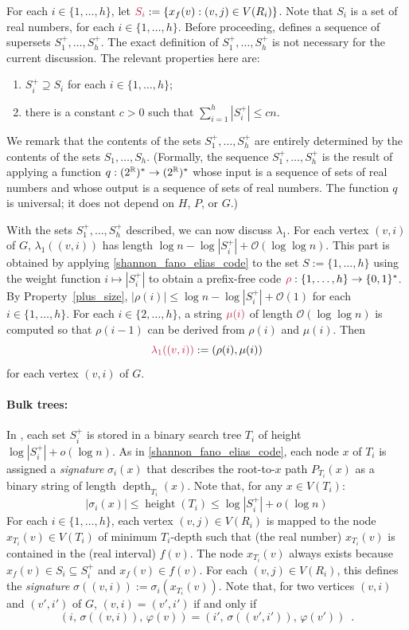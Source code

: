 \documentclass{patmorin}
\makeatletter
\renewcommand{\le}{\leqslant}
\DeclareMathOperator{\height}{height}
\DeclareMathOperator{\depth}{depth}
\newcommand{\defin}[1]{\emph{\textcolor{brightmaroon}{#1}}}
\def\mathcolor#1#{\@mathcolor{#1}}
\def\@mathcolor#1#2#3{%
  \protect\leavevmode
  \begingroup
    \color#1{#2}#3%
  \endgroup
}
\newcommand{\mathdefin}[1]{\mathcolor{brightmaroon}{#1}}
\newcommand{\Oh}{\mathcal{O}}
\makeatother
\begin{document}
  For each $i\in\{1,\ldots,h\}$, let $\mathdefin{S_i}:=\{x_f(v):(v,j)\in V(R_i)\}$.
  Note that $S_i$ is a set of real numbers, for each $i\in\{1,\ldots,h\}$.
  Before proceeding, \cite{dujmovic.esperet.ea:adjacency} defines a sequence of supersets \defin{$S^+_1,\ldots,S^+_h$}. The exact definition of $S^+_1,\ldots,S^+_h$ is not necessary for the current discussion.
  The relevant properties here are:
  \begin{enumerate}[label=(\alph*)]
      \item\label{plus_superset} $S^+_i\supseteq S_i$ for each $i\in\{1,\ldots,h\}$;
      \item\label{plus_size} there is a constant $c>0$ such that $\sum_{i=1}^h |S^+_i|\le cn$.
  \end{enumerate}
  We remark that the contents of the sets $S^+_1,\ldots,S^+_h$ are entirely determined by the contents of the sets $S_1,\ldots,S_h$.
  (Formally, the sequence $S^+_1,\ldots,S^+_h$ is the result of applying a function $q:(2^{\mathbb{R}})^*\to (2^{\mathbb{R}})^*$ whose input is a sequence of sets of real numbers and whose output is a sequence of sets of real numbers. The function $q$ is universal; it does not depend on $H$, $P$, or $G$.)

  With the sets $S^+_1,\ldots,S^+_h$ described, we can now discuss $\lambda_1$.
  For each vertex $(v,i)$ of $G$, $\lambda_1((v,i))$ has length $\log n - \log |S^+_i| + \Oh(\log\log n)$.
  This part is obtained by applying \cref{shannon_fano_elias_code} to the set $S:=\{1,\ldots,h\}$ using the weight function $i \mapsto |S^+_i|$ to obtain a prefix-free code $\mathdefin{\rho}:\{1,\ldots,h\}\to\{0,1\}^*$.
  By Property~\ref{plus_size}, $|\rho(i)|\le \log n - \log|S^+_i| + \Oh(1)$ for each $i\in\{1,\ldots,h\}$.
  For each $i\in\{2,\ldots,h\}$, a string $\mathdefin{\mu(i)}$ of length $\Oh(\log\log n)$ is computed so that $\rho(i-1)$ can be derived from $\rho(i)$ and $\mu(i)$.
  Then
  \[
     \mathdefin{\lambda_1((v,i))}:=(\rho(i),\mu(i))
  \]
  for each vertex $(v,i)$ of $G$.

  \paragraph{Bulk trees:}
  In \cite{dujmovic.esperet.ea:adjacency}, each set $S^+_i$ is stored in a binary search tree $T_i$ of height $\log|S^+_i|+o(\log n)$.
  As in \cref{shannon_fano_elias_code}, each node $x$ of $T_i$ is assigned a \defin{signature} \defin{$\sigma_i(x)$} that describes the root-to-$x$ path $P_{T_i}(x)$ as a binary string of length $\depth_{T_i}(x)$.
  Note that, for any $x\in V(T_i)$:
  \[
    |\sigma_i(x)| \le \height(T_i) \le \log|S^+_i|+o(\log n)
  \]
  For each $i\in\{1,\ldots,h\}$, each vertex $(v,j)\in V(R_i)$ is mapped to the node $x_{T_i}(v)\in V(T_i)$ of minimum $T_i$-depth such that (the real number) $x_{T_i}(v)$ is contained in the (real interval) $f(v)$.
  The node $x_{T_i}(v)$ always exists because $x_f(v)\in S_i\subseteq S_i^+$ and $x_f(v)\in f(v)$.
  For each $(v,j)\in V(R_i)$, this defines the \defin{signature} $\sigma((v,i)):=\sigma_i(x_{T_i}(v))$.  Note that, for two vertices $(v,i)$ and $(v',i')$ of $G$, $(v,i)=(v',i')$ if and only if
  \[
     (i,\,\sigma((v,i)),\,\varphi(v)) = (i',\,\sigma((v',i')),\,\varphi(v')) \enspace .
  \]
\end{document}
